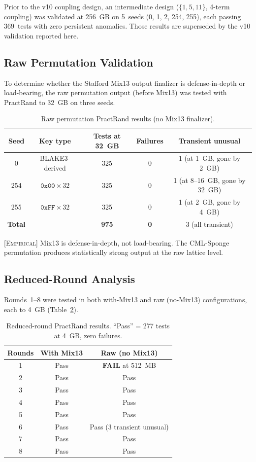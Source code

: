 \documentclass[runningheads]{llncs}
\newcommand{\empirical}[1]{\textsc{[Empirical]} #1}
\begin{document}
Prior to the v10 coupling design, an intermediate design ($\{1,5,11\}$, 4-term
coupling) was validated at 256~GB on 5~seeds (0, 1, 2, 254, 255), each passing
369~tests with zero persistent anomalies.  Those results are superseded by the
v10 validation reported here.

\subsection{Raw Permutation Validation}

To determine whether the Stafford Mix13 output finalizer is defense-in-depth
or load-bearing, the raw permutation output (before Mix13) was tested with
PractRand to 32~GB on three seeds.

\begin{table}[h]
\centering
\caption{Raw permutation PractRand results (no Mix13 finalizer).}
\label{tab:practrand-raw}
\begin{tabular}{@{}ccccc@{}}
\toprule
Seed & Key type & Tests at 32~GB & Failures & Transient unusual \\
\midrule
0 & BLAKE3-derived & 325 & 0 & 1 (at 1~GB, gone by 2~GB) \\
254 & $\texttt{0x00} \times 32$ & 325 & 0 & 1 (at 8--16~GB, gone by 32~GB) \\
255 & $\texttt{0xFF} \times 32$ & 325 & 0 & 1 (at 2~GB, gone by 4~GB) \\
\midrule
\textbf{Total} & & \textbf{975} & \textbf{0} & 3 (all transient) \\
\bottomrule
\end{tabular}
\end{table}

\empirical{Mix13 is defense-in-depth, not load-bearing.  The CML-Sponge
permutation produces statistically strong output at the raw lattice level.}

\subsection{Reduced-Round Analysis}

Rounds~1--8 were tested in both with-Mix13 and raw (no-Mix13) configurations,
each to 4~GB (Table~\ref{tab:reduced-round}).

\begin{table}[h]
\centering
\caption{Reduced-round PractRand results.  ``Pass'' = 277 tests at 4~GB, zero failures.}
\label{tab:reduced-round}
\begin{tabular}{@{}ccc@{}}
\toprule
Rounds & With Mix13 & Raw (no Mix13) \\
\midrule
1 & Pass & \textbf{FAIL} at 512~MB \\
2 & Pass & Pass \\
3 & Pass & Pass \\
4 & Pass & Pass \\
5 & Pass & Pass \\
6 & Pass & Pass (3 transient unusual) \\
7 & Pass & Pass \\
8 & Pass & Pass \\
\bottomrule
\end{tabular}
\end{table}
\end{document}

